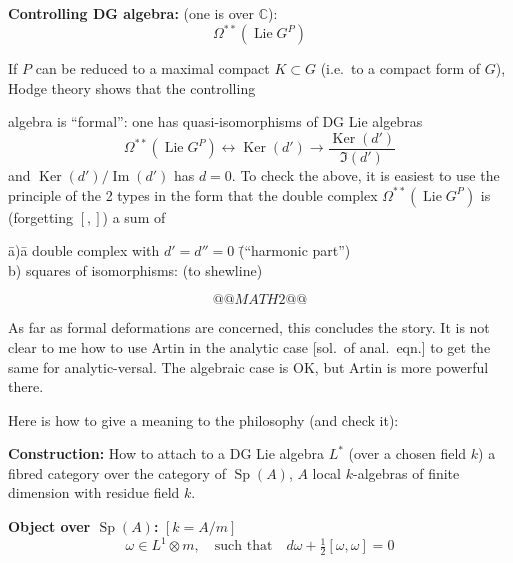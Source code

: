 \documentclass[11pt,a4paper]{article}
\DeclareMathOperator{\Sp}{Sp}
\DeclareMathOperator{\Ker}{Ker}
\begin{document}
\noindent\textbf{Controlling DG algebra:} (one is over $\mathbb{C}$):
\[
\Omega^{**}(\operatorname{Lie} G^P)
\]

If $P$ can be reduced to a maximal compact $K \subset G$ (i.e.\ to a compact form of $G$), Hodge theory shows that the controlling

\newpage

\noindent algebra is ``formal'': one has quasi-isomorphisms of DG Lie algebras
\begin{equation}\label{eq:1}
\Omega^{**}(\operatorname{Lie} G^P) \longleftrightarrow \Ker(d') \longrightarrow \frac{\Ker(d')}{\Im(d')}
\end{equation}
and $\Ker(d')/\operatorname{Im}(d')$ has $d=0$. To check the above, it is easiest to use the principle of the 2 types in the form that the double complex $\Omega^{**}(\operatorname{Lie} G^P)$ is (forgetting $[,]$) a sum of

\vspace{0.2cm}
\begin{tabbing}
\hspace{1cm}\= a)\hspace{0.3cm}\= a double complex with $d'=d''=0$ \hspace{1cm}\= (``harmonic part'')\\[0.2cm]
\> b)\> squares of isomorphisms: \> (to shewline)
\end{tabbing}
\vspace{-0.3cm}
\[
@@MATH2@@
\]

As far as formal deformations are concerned, this concludes the story. It is not clear to me how to use Artin in the analytic case [sol.\ of anal.\ eqn.] to get the same for analytic-versal. The algebraic case is OK, but Artin is more powerful there.

\vspace{0.3cm}

Here is how to give a meaning to the philosophy (and check it):

\vspace{0.2cm}

\noindent\textbf{Construction:} How to attach to a DG Lie algebra $L^*$ (over a chosen field $k$) a fibred category over the category of $\Sp(A)$, $A$ local $k$-algebras of finite dimension with residue field $k$.

\vspace{0.2cm}

\noindent\textbf{Object over $\Sp(A)$:} $[k = A/m]$
\[
\omega \in L^1 \otimes m, \quad \text{such that} \quad d\omega + \tfrac{1}{2}[\omega,\omega] = 0
\]
\end{document}
